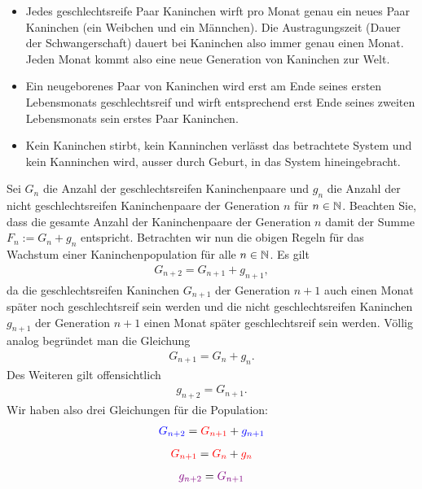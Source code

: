 \begin{itemize}
    \item Jedes geschlechtsreife Paar Kaninchen wirft pro Monat genau ein neues Paar Kaninchen (ein Weibchen und ein Männchen). Die Austragungszeit (Dauer der Schwangerschaft) dauert bei Kaninchen also immer genau einen Monat. Jeden Monat kommt also eine neue Generation von Kaninchen zur Welt.
    \item Ein neugeborenes Paar von Kaninchen wird erst am Ende seines ersten Lebensmonats geschlechtsreif und wirft entsprechend erst Ende seines zweiten Lebensmonats sein erstes Paar Kaninchen.
    \item Kein Kaninchen stirbt, kein Kanninchen verlässt das betrachtete System und kein Kanninchen wird, ausser durch Geburt, in das System hineingebracht.
\end{itemize}
Sei $G_n$ die Anzahl der geschlechtsreifen Kaninchenpaare und $g_n$ die Anzahl der nicht geschlechtsreifen Kaninchenpaare der Generation $n$ für $n\in\mathbb{N}$. Beachten Sie, dass die gesamte Anzahl der Kaninchenpaare der Generation $n$ damit der Summe $F_n := G_n+g_n$ entspricht. Betrachten wir nun die obigen Regeln für das Wachstum einer Kaninchenpopulation für alle $n\in\mathbb{N}$. Es gilt
\begin{align}
    G_{n+2} = G_{n+1} + g_{n+1},
\end{align}
da die geschlechtsreifen Kaninchen $G_{n+1}$ der Generation $n+1$ auch einen Monat später noch geschlechtsreif sein werden und die nicht geschlechtsreifen Kaninchen $g_{n+1}$ der Generation $n+1$ einen Monat später geschlechtsreif sein werden. Völlig analog begründet man die Gleichung
\begin{align}
    G_{n+1} = G_{n} + g_{n}.
\end{align}
Des Weiteren gilt offensichtlich
\begin{align}
    g_{n+2}  = G_{n+1}.
\end{align}
Wir haben also drei Gleichungen für die Population:
\begin{align}\label{eq:Fib1}
    \textcolor{Blue}{G_{n+2}} = \textcolor{Red}{G_{n+1}} +  \textcolor{Blue}{g_{n+1}}
\end{align}
\begin{align}\label{eq:Fib2}
    \textcolor{Red}{G_{n+1}} = \textcolor{Red}{G_{n}} + \textcolor{Red}{g_{n}}
\end{align}
\begin{align}\label{eq:Fib3}
    \textcolor{Purple}{g_{n+2}}  = \textcolor{Purple}{G_{n+1}}
\end{align}


